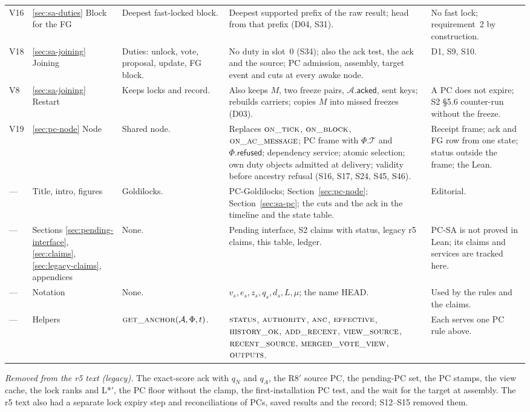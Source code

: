\documentclass{article}
\newcommand{\T}{\mathcal T}
\newcommand{\AC}{\mathcal A}
\newcommand{\Fr}{\Phi}
\newcommand{\acked}{\mathsf{acked}}
\begin{document}
{\begin{longtable}{@{}p{0.6cm}p{2.1cm}p{3.6cm}p{3.9cm}p{4.3cm}@{}}
V16 & \ref{sec:sa-duties} Block for the FG & Deepest fast-locked block. & Deepest supported prefix of the raw result; head from that prefix (D04, S31). & No fast lock; requirement~2 by construction.\\
V18 & \ref{sec:sa-joining} Joining & Duties: unlock, vote, proposal, update, FG block. & No duty in slot~0 (S34); also the ack test, the ack and the source; PC admission, assembly, target event and cuts at every awake node. & D1, S9, S10.\\
V8 & \ref{sec:sa-joining} Restart & Keeps locks and record. & Also keeps $M$, two freeze pairs, $\AC.\acked$, sent keys; rebuilds carriers; copies $M$ into missed freezes (D03). & A PC does not expire; S2 \S5.6 counter-run without the freeze.\\
V19 & \ref{sec:pc-node} Node & Shared node. & Replaces $\Call{on\_tick}{}$, $\Call{on\_block}{}$, $\Call{on\_ac\_message}{}$; PC frame with $\Fr.\T$ and $\Fr.\mathsf{refused}$; dependency service; atomic selection; own duty objects admitted at delivery; validity before ancestry refusal (S16, S17, S24, S45, S46). & Receipt frame; ack and FG row from one state; status outside the frame; the Lean.\\
\hline
--- & Title, intro, figures & Goldilocks. & PC-Goldilocks; Section~\ref{sec:pc-node}; Section~\ref{sec:sa-pc}; the cuts and the ack in the timeline and the state table. & Editorial.\\
--- & Sections \ref{sec:pending-interface}, \ref{sec:claims}, \ref{sec:legacy-claims}, appendices & None. & Pending interface, S2 claims with status, legacy r5 claims, this table, ledger. & PC-SA is not proved in Lean; its claims and services are tracked here.\\
--- & Notation & None. & $v_s,e_s,z_s,q_s,d_s,L,\mu$; the name HEAD. & Used by the rules and the claims.\\
--- & Helpers & $\Call{get\_anchor}{\AC,\Fr,t}$. & $\Call{status}{}$, $\Call{authority}{}$, $\Call{anc}{}$, $\Call{effective}{}$, $\Call{history\_ok}{}$, $\Call{add\_recent}{}$, $\Call{view\_source}{}$, $\Call{recent\_source}{}$, $\Call{merged\_vote\_view}{}$, $\Call{outputs}{}$. & Each serves one PC rule above.\\
\hline
\end{longtable}
}

\emph{Removed from the r5 text (legacy).}  The exact-score ack with $q_N$
and $q_A$, the R8$'$ source PC, the pending-PC set, the PC stamps, the
view cache, the lock ranks and L*$'$, the PC floor without the clamp, the
first-installation PC test, and the wait for the target at assembly.  The
r5 text also had a separate lock expiry step and reconciliations of PCs,
saved results and the record; S12--S15 removed them.
\end{document}
